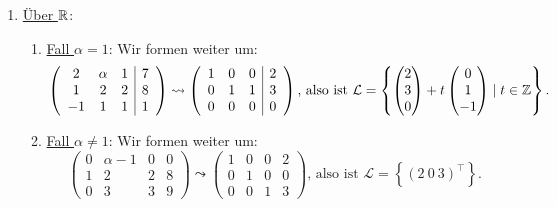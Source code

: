\begin{enumerate}
	\item \underline{Über \( \mathbb{R} \)}:
	\begin{enumerate}
	 	\item \underline{Fall \( \alpha = 1 \)}: Wir formen weiter um:
	 	\begin{equation*}
			\left( \begin{array}{ccc|c}
				2 & \alpha & 1 & 7 \\
				1 & 2 & 2 & 8 \\
				-1 & 1 & 1 & 1
			\end{array} \right) \leadsto \left( \begin{array}{ccc|c}
				1 & 0 & 0 & 2 \\
				0 & 1 & 1 & 3 \\
				0 & 0 & 0 & 0 
			\end{array} \right)\text{, also ist }\mathcal{L} = \left\{ \begin{pmatrix}
	 	 	2 \\ 3 \\ 0
	 	 \end{pmatrix} + t \begin{pmatrix}
	 	 	0 \\ 1 \\ -1
	 	 \end{pmatrix} \mid t \in \mathbb{Z} \right\}\text{.}
 	 	\end{equation*}

	 	 \item \underline{Fall \( \alpha \neq 1 \)}: Wir formen weiter um:
	 	 \begin{equation*}
	 	 	\left( \begin{array}{ccc|c}
	 	 		0 & \alpha-1 & 0 & 0 \\
	 	 		1 & 2 & 2 & 8 \\
	 	 		0 & 3 & 3 & 9
	 	 	\end{array} \right) \leadsto \left( \begin{array}{ccc|c}
	 	 		1 & 0 & 0 & 2 \\
	 	 		0 & 1 & 0 & 0 \\
	 	 		0 & 0 & 1 & 3
	 	 	\end{array} \right)\text{, also ist } \mathcal{L} = \left\{ \left( 2 \ 0 \ 3 \right)^\top \right\}\text{.}
 	 	\end{equation*}
	 \end{enumerate} 


\end{enumerate}
